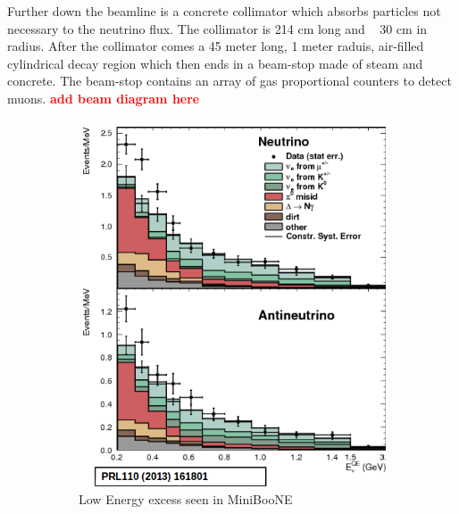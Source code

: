 Further down the beamline is a concrete collimator which absorbs particles not necessary to the neutrino flux. The collimator is 214 cm long and ~ 30 cm in radius. After the collimator comes a 45 meter long, 1 meter raduis, air-filled cylindrical decay region which then ends in a beam-stop made of steam and concrete. The beam-stop contains an array of gas proportional counters to detect muons. \textcolor{red}{\textbf{add beam diagram here}}     



\begin{figure}[htp!]
\centering
	\begin{subfigure}[b]{.4\textwidth}
	\includegraphics[width=\textwidth]{figs/lee.png}
	\caption{Low Energy excess seen in MiniBooNE}
	\label{fig:lee}
	\end{subfigure}
	\quad
	\begin{subfigure}[b]{.4\textwidth}

\end{subfigure}
\end{figure}

